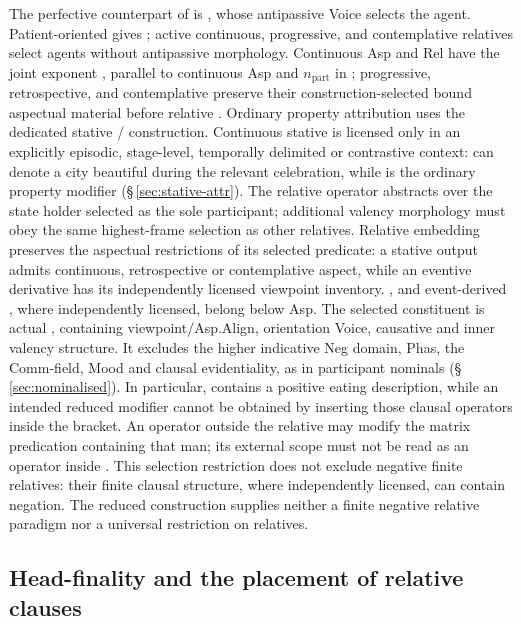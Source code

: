 The perfective counterpart of  is
, whose antipassive Voice selects the agent. Patient-oriented
 gives ; active continuous, progressive, and
contemplative relatives select agents without antipassive morphology.
Continuous Asp and Rel have the joint exponent , parallel to
continuous Asp and $n_{\mathrm{part}}$ in ; progressive,
retrospective, and contemplative preserve their construction-selected bound
aspectual material before relative . Ordinary property attribution
uses the dedicated stative / construction. Continuous
stative  is licensed only in an explicitly episodic, stage-level,
temporally delimited or contrastive context:  can denote
a city beautiful during the relevant celebration, while 
is the ordinary property modifier (§\,\ref{sec:stative-attr}). The relative
operator abstracts over the state holder selected as the sole participant;
additional valency morphology must obey the same highest-frame selection as
other relatives. Relative embedding preserves the aspectual restrictions of
its selected predicate: a stative output admits continuous, retrospective or
contemplative aspect, while an eventive derivative has its independently
licensed viewpoint inventory. ,  and event-derived
, where independently licensed, belong below Asp.
The selected constituent is actual
, containing viewpoint/Asp.Align, orientation Voice, causative
and inner valency structure. It excludes the higher indicative Neg domain,
Phas, the Comm-field, Mood and clausal evidentiality, as in participant
nominals (§\,\ref{sec:nominalised}). In particular,
 contains a positive eating description, while
an intended reduced modifier  cannot be obtained by inserting those clausal operators inside the
bracket. An operator outside the relative may modify the matrix predication
containing that man; its external scope must not be read as an operator inside
. This selection restriction does not exclude negative finite
relatives: their finite clausal structure, where independently licensed, can
contain negation. The reduced  construction supplies neither a
finite negative relative paradigm nor a universal restriction on relatives.

\subsection{Head-finality and the placement of relative clauses}
\label{sec:th-rel-headfinal}

